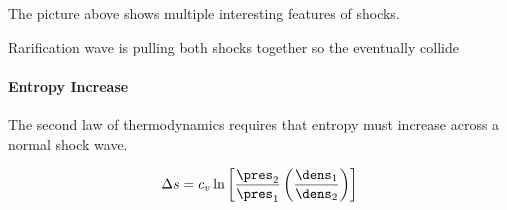 The picture above shows multiple interesting features of shocks.

Rarification wave is pulling both shocks together so the eventually collide

\paragraph{Entropy Increase}

The second law of thermodynamics requires that entropy must increase across a normal shock
wave.

\begin{equation}
    \Delta s = c_v \ln\left[\frac{\pres_2}{\pres_1}\left(\frac{\dens_1}{\dens_2}\right)\right]
\end{equation}
